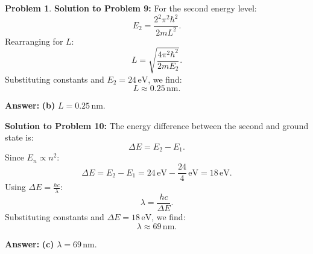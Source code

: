\documentclass[12pt]{article}
\theoremstyle{definition} %
\newtheorem{problem}{Problem}
\theoremstyle{plain} %
\begin{document}
\begin{problem}
\textbf{Solution to Problem 9:}
For the second energy level:
$$
E_2 = \frac{2^2 \pi^2 \hbar^2}{2mL^2}.
$$
Rearranging for \(L\):
$$
L = \sqrt{\frac{4 \pi^2 \hbar^2}{2mE_2}}.
$$
Substituting constants and \(E_2 = 24 \, \text{eV}\), we find:
$$
L \approx 0.25 \, \text{nm}.
$$

\textbf{Answer:} \textbf{(b)} \(L = 0.25 \, \text{nm}\).

\textbf{Solution to Problem 10:}
The energy difference between the second and ground state is:
$$
\Delta E = E_2 - E_1.
$$
Since \(E_n \propto n^2\):
$$
\Delta E = E_2 - E_1 = 24 \, \text{eV} - \frac{24}{4} \, \text{eV} = 18 \, \text{eV}.
$$
Using \(\Delta E = \frac{hc}{\lambda}\):
$$
\lambda = \frac{hc}{\Delta E}.
$$
Substituting constants and \(\Delta E = 18 \, \text{eV}\), we find:
$$
\lambda \approx 69 \, \text{nm}.
$$

\textbf{Answer:} \textbf{(c)} \(\lambda = 69 \, \text{nm}\).

\end{problem}
\end{document}
